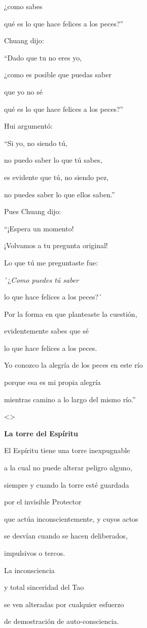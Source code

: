 ¿como sabes

qué es lo que hace felices a los peces?''

Chuang dijo:

``Dado que tu no eres yo,

¿como es posible que puedas saber

que yo no sé

qué es lo que hace felices a los peces?''

Hui argumentó:

``Si yo, no siendo tú,

no puedo saber lo que tú sabes,

es evidente que tú, no siendo pez,

no puedes saber lo que ellos saben.''

Pues Chuang dijo:

``¡Espera un momento!

¡Volvamos a tu pregunta original!

Lo que tú me preguntaste fue:

´¿\emph{Como puedes tú saber}

lo que hace felices a los peces?´

Por la forma en que planteaste la cuestión,

evidentemente sabes que sé

lo que hace felices a los peces.

Yo conozco la alegría de los peces en este río

porque esa es mi propia alegría

mientras camino a lo largo del mismo río.''

\textless\textgreater{}

\textbf{{La torre del Espíritu}}

El Espíritu tiene una torre inexpugnable

a la cual no puede alterar peligro alguno,

siempre y cuando la torre esté guardada

por el invisible Protector

que actúa inconscientemente, y cuyos actos

se desvían cuando se hacen deliberados,

impulsivos o tercos.

La inconsciencia

y total sinceridad del Tao

se ven alteradas por cualquier esfuerzo

de demostración de auto-consciencia.

